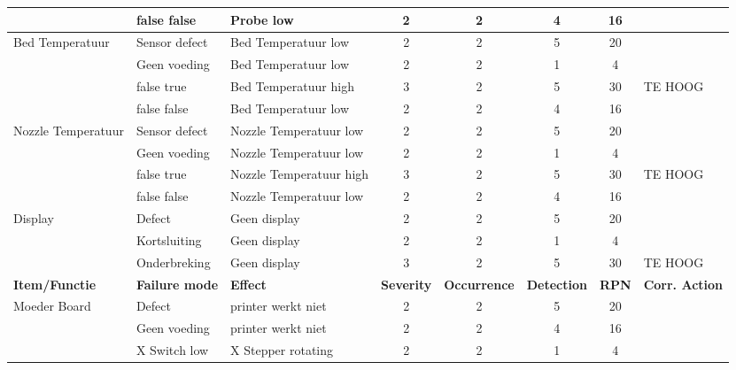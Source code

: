 \begin{landscape}
\begin{longtable}{|l|l|l|c|c|c|c|l|}
                                            & false false       & Probe low  & 2 & 2 & 4 & 16 & \\ 
                                            \hline
        \multirow{4}{*}{Bed Temperatuur}    & Sensor defect     & Bed Temperatuur low  & 2 & 2 & 5 & 20 & \\
                                            & Geen voeding      & Bed Temperatuur low  & 2 & 2 & 1 &  4 & \\
                                            & false true        & Bed Temperatuur high & 3 & 2 & 5 & 30 & TE HOOG \\
                                            & false false       & Bed Temperatuur low  & 2 & 2 & 4 & 16 & \\ 
                                            \hline
        \multirow{4}{*}{Nozzle Temperatuur} & Sensor defect     & Nozzle Temperatuur low  & 2 & 2 & 5 & 20 & \\
                                            & Geen voeding      & Nozzle Temperatuur low  & 2 & 2 & 1 &  4 & \\
                                            & false true        & Nozzle Temperatuur high & 3 & 2 & 5 & 30 & TE HOOG \\
                                            & false false       & Nozzle Temperatuur low  & 2 & 2 & 4 & 16 & \\ 
                                            \hline          
        \multirow{3}{*}{Display}            & Defect            & Geen display  & 2 & 2 & 5 & 20 & \\ 
                                            & Kortsluiting      & Geen display  & 2 & 2 & 1 &  4 & \\
                                            & Onderbreking      & Geen display  & 3 & 2 & 5 & 30 & TE HOOG \\
                                            \hline 
        \newpage
        \hline
        \textbf{Item/Functie} & \textbf{Failure mode} & \textbf{Effect} & \textbf{Severity} & \textbf{Occurrence} & \textbf{Detection} & \textbf{RPN} & \textbf{Corr. Action} \\ \hline
        \multirow{15}{*}{Moeder Board}      & Defect                    & printer werkt niet        & 2 & 2 & 5 & 20 & \\
                                            & Geen voeding              & printer werkt niet        & 2 & 2 & 4 & 16 & \\
                                            & X Switch low              & X Stepper rotating        & 2 & 2 & 1 &  4 & \\

\end{longtable}
\end{landscape}
